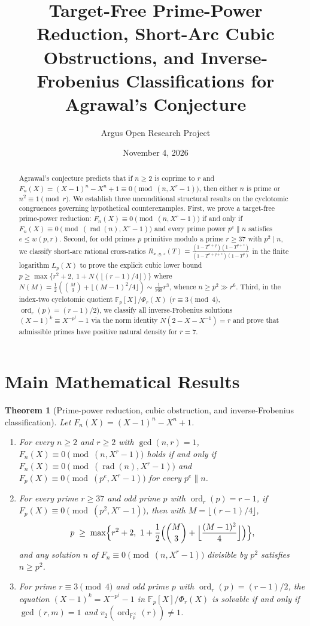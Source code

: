 \documentclass[10pt,reqno]{amsart}
\title[Cubic Obstructions and Inverse-Frobenius Classification for Agrawal's Conjecture]
{Target-Free Prime-Power Reduction, Short-Arc Cubic Obstructions, and Inverse-Frobenius Classifications for Agrawal's Conjecture}
\author{Argus Open Research Project}
\date{November 4, 2026}
\newtheorem{theorem}{Theorem}[section]
\theoremstyle{definition}
\begin{document}
\begin{abstract}
Agrawal's conjecture predicts that if $n \ge 2$ is coprime to $r$ and $F_n(X) = (X-1)^n - X^n + 1 \equiv 0 \pmod{(n, X^r-1)}$, then either $n$ is prime or $n^2 \equiv 1 \pmod r$. We establish three unconditional structural results on the cyclotomic congruences governing hypothetical counterexamples. First, we prove a target-free prime-power reduction: $F_n(X) \equiv 0 \pmod{(n,X^r-1)}$ if and only if $F_n(X) \equiv 0 \pmod{(\operatorname{rad}(n),X^r-1)}$ and every prime power $p^e \parallel n$ satisfies $e \le w(p,r)$. Second, for odd primes $p$ primitive modulo a prime $r \ge 37$ with $p^2 \mid n$, we classify short-arc rational cross-ratios $R_{x,y,z}(T) = \frac{(1-T^{x+y})(1-T^{y+z})}{(1-T^{x+y+z})(1-T^y)}$ in the finite logarithm $L_p(X)$ to prove the explicit cubic lower bound $p \ge \max\{r^2+2,\ 1 + N(\lfloor(r-1)/4\rfloor)\}$ where $N(M) = \frac{1}{2}(\binom{M}{3} + \lfloor(M-1)^2/4\rfloor) \sim \frac{1}{768}r^3$, whence $n \ge p^2 \gg r^6$. Third, in the index-two cyclotomic quotient $\mathbb{F}_p[X]/\Phi_r(X)$ ($r \equiv 3 \pmod 4$, $\operatorname{ord}_r(p)=(r-1)/2$), we classify all inverse-Frobenius solutions $(X-1)^k \equiv X^{-p^j}-1$ via the norm identity $N(2-X-X^{-1})=r$ and prove that admissible primes have positive natural density for $r=7$.
\end{abstract}
\maketitle

\section{Main Mathematical Results}
\begin{theorem}[Prime-power reduction, cubic obstruction, and inverse-Frobenius classification]
Let $F_n(X) = (X-1)^n - X^n + 1$.
\begin{enumerate}[label=\textup{(\arabic*)}]
  \item For every $n \ge 2$ and $r \ge 2$ with $\gcd(n,r)=1$, $F_n(X) \equiv 0 \pmod{(n,X^r-1)}$ holds if and only if $F_n(X) \equiv 0 \pmod{(\operatorname{rad}(n),X^r-1)}$ and $F_p(X) \equiv 0 \pmod{(p^e,X^r-1)}$ for every $p^e \parallel n$.
  \item For every prime $r \ge 37$ and odd prime $p$ with $\operatorname{ord}_r(p)=r-1$, if $F_p(X) \equiv 0 \pmod{(p^2,X^r-1)}$, then with $M = \lfloor(r-1)/4\rfloor$,
  \[
    p \;\ge\; \max\Bigl\{r^2+2,\ 1 + \frac{1}{2}\Bigl(\binom{M}{3} + \Bigl\lfloor\frac{(M-1)^2}{4}\Bigr\rfloor\Bigr)\Bigr\},
  \]
  and any solution $n$ of $F_n \equiv 0 \pmod{(n,X^r-1)}$ divisible by $p^2$ satisfies $n \ge p^2$.
  \item For prime $r \equiv 3 \pmod 4$ and odd prime $p$ with $\operatorname{ord}_r(p)=(r-1)/2$, the equation $(X-1)^k = X^{-p^j}-1$ in $\mathbb{F}_p[X]/\Phi_r(X)$ is solvable if and only if $\gcd(r,m)=1$ and $v_2(\operatorname{ord}_{\mathbb{F}_p^\times}(r)) \neq 1$.
\end{enumerate}
\end{theorem}
\end{document}
